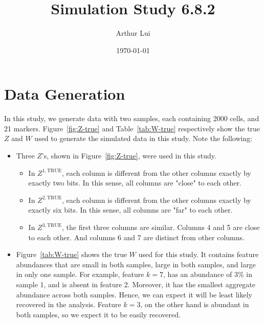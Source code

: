 \documentclass[10pt]{article} %
\title{Simulation Study 6.8.2}
\author{Arthur Lui}
\date{\today} %
\def\true{\text{TRUE}}
\begin{document}
\maketitle



\section{Data Generation}\label{sec:data-generation}
In this study, we generate data with two samples, each containing 2000 cells,
and 21 markers. Figure~\ref{fig:Z-true} and Table~\ref{tab:W-true}
respectively show the true $Z$ and $W$ used to generate the simulated data in
this study. Note the following:
\begin{itemize}
  \item Three $Z$'s, shown in Figure~\ref{fig:Z-true}, were used in this study.
  \begin{itemize}
    \item In $Z^{1,\true}$, each column is different from the other columns exactly
    by exactly two bits. In this sense, all columns are "close" to each
    other.
    \item In $Z^{2,\true}$, each column is different from the other columns exactly
    by exactly six bits. In this sense, all columns are "far" to each
    other.
    \item In $Z^{3,\true}$, the first three columns are similar. Columns 4 and 5 are 
    close to each other. And columns 6 and 7 are distinct from other columns. 
  \end{itemize}
  \item Figure~\ref{tab:W-true} shows the true $W$ used for this study. It
    contains feature abundances that are small in both samples, large in both
    samples, and large in only one sample. For example, feature $k=7$, 
    has an abundance of $3\%$ in sample 1, and is absent in feature 2. 
    Moreover, it has the smallest aggregate abundance across both samples. 
    Hence, we can expect it will be least likely recovered in the analysis. 
    Feature $k=3$, on the other hand is abundant in both samples, so we expect
    it to be easily recovered.
\end{itemize}
\end{document}
